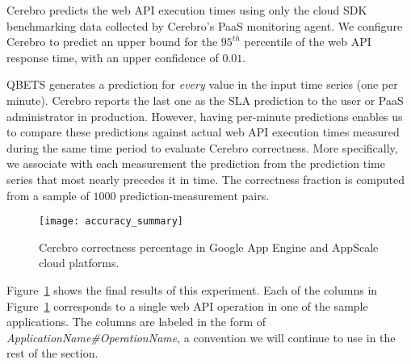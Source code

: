 Cerebro predicts the web API execution times using only the cloud SDK
benchmarking data collected by Cerebro's PaaS monitoring agent. 
We configure Cerebro to predict an
upper bound for the $95^{th}$ percentile of the web API response time, with an
upper confidence of $0.01$. 

QBETS generates a prediction for \textit{every} value in the input time series 
(one per minute).  Cerebro reports the last one as the SLA prediction to the
user or PaaS administrator in production.  However, having per-minute predictions 
enables us to compare these predictions against actual web API execution
times measured during the same time period to evaluate Cerebro correctness. 
More specifically, we
associate with each measurement the prediction from the prediction time series
that most nearly precedes it in time.  The correctness fraction is computed
from a sample of $1000$ prediction-measurement pairs.


\begin{figure}
\centering
\texttt{[image: accuracy\_summary]}
\caption{Cerebro correctness percentage in Google App Engine and AppScale cloud platforms.}
\label{fig:accuracy_summary}
\end{figure}

Figure~\ref{fig:accuracy_summary} shows the final results of this experiment.
Each of the columns in Figure~\ref{fig:accuracy_summary} corresponds 
to a single web API operation in 
one of the sample applications. The columns are labeled in the 
form of \textit{ApplicationName\#OperationName}, a convention 
we will continue to use in the rest of the section. %


